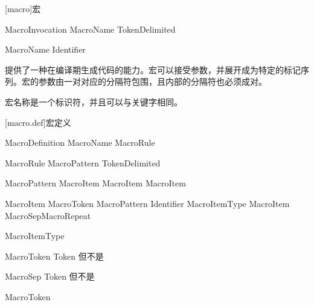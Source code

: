 
[macro]{宏}

\begin{bnf}{MacroInvocation}
    \terminal{\#} MacroName TokenDelimited\bnfq
\end{bnf}

\begin{bnf}{MacroName}
    Identifier
\end{bnf}

\pnum
{}提供了一种在编译期生成代码的能力。宏可以接受参数，并展开成为特定的标记序列。宏的参数由一对对应的分隔符包围，且内部的分隔符也必须成对。

\pnum
宏名称是一个标识符，并且可以与关键字相同。

[macro.def]{宏定义}

\begin{bnf}{MacroDefinition}
     MacroName \terminal{\{} MacroRule\bnfs \terminal{\}}
\end{bnf}

\begin{bnf}{MacroRule}
    MacroPattern \terminal{->} TokenDelimited
\end{bnf}

\begin{bnf}{MacroPattern}
    \terminal{(} MacroItem\bnfs \terminal{)} \br
    \terminal{[} MacroItem\bnfs \terminal{]} \br
    \terminal{\{} MacroItem\bnfs \terminal{\}}
\end{bnf}

\begin{bnf}{MacroItem}
    MacroToken \br
    MacroPattern \br
    \terminal{\#} Identifier \terminal{:} MacroItemType \br
    \terminal{\#} \terminal{(} MacroItem\bnfp \terminal{)} MacroSep\bnfs MacroRepeat
\end{bnf}

\begin{bnf}{MacroItemType}{\oneof}
\end{bnf}

\begin{bnf}{MacroToken}
    Token \textnormal{但不是} \terminal{( ) [ ] \{ \}}
\end{bnf}

\begin{bnf}{MacroSep}
    Token \textnormal{但不是} 
\end{bnf}

\begin{bnf}{MacroToken}{\oneof}
\end{bnf}

